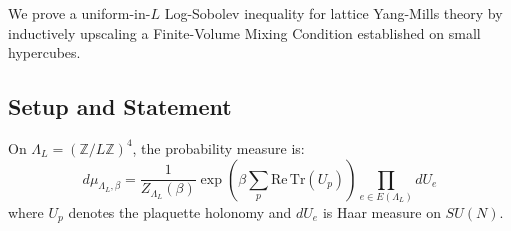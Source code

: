 We prove a uniform-in-$L$ Log-Sobolev inequality for lattice Yang-Mills theory 
by inductively upscaling a Finite-Volume Mixing Condition established on small hypercubes.

\subsection{Setup and Statement}

\begin{definition}
On $\Lambda_L = (\mathbb{Z}/L\mathbb{Z})^4$, the probability measure is:
\begin{equation}
d\mu_{\Lambda_L,\beta} = \frac{1}{Z_{\Lambda_L}(\beta)} 
\exp\left(\beta \sum_p \mathrm{Re}\,\mathrm{Tr}(U_p)\right) \prod_{e \in E(\Lambda_L)} dU_e
\end{equation}
where $U_p$ denotes the plaquette holonomy and $dU_e$ is Haar measure on $SU(N)$.
\end{definition}

